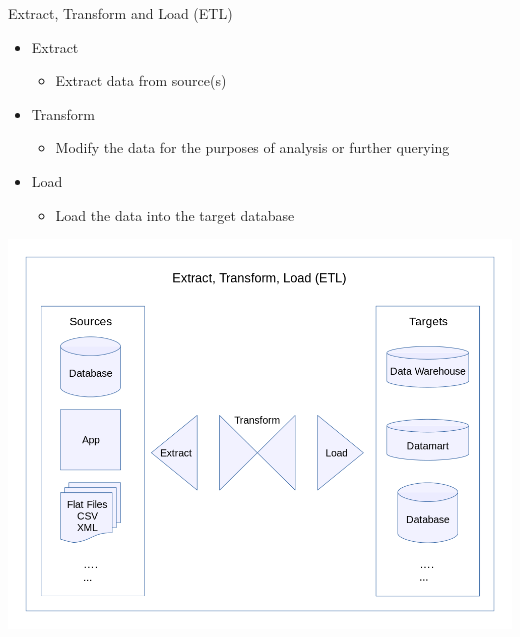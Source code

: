 \documentclass[10pt, xcolor=table]{beamer}
\begin{document}
\begin{frame}{Extract, Transform and Load (ETL)}
	\begin{itemize}
		\item Extract
		\begin{itemize}
			\item Extract data from source(s)
		\end{itemize}
		\item Transform
		\begin{itemize}
			\item Modify the data for the purposes of analysis or further querying
		\end{itemize}
		\item Load
		\begin{itemize}
			\item Load the data into the target database
		\end{itemize}
	\end{itemize}
	\begin{center}
		\includegraphics[scale=0.15]{images/Extract,_Transform,_Load_Data_Flow_Diagram.png}
	\end{center}
	
\end{frame}


%
\end{document}
